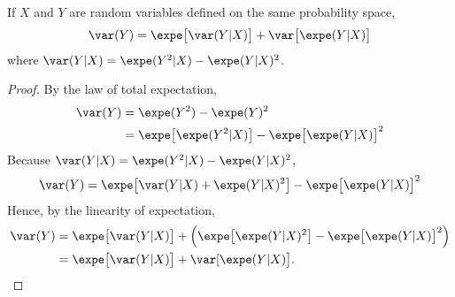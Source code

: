 \begin{theorem}
If $X$ and $Y$ are random variables defined on the same probability space,
\[
\var(Y) = \expe\big[\var(Y|X)\big] + \var\big[\expe(Y|X)\big] 
\]
where $\var(Y|X)=\expe(Y^2|X) - \expe(Y|X)^2$.
\end{theorem}
\begin{proof}
By the law of total expectation,
\begin{align*}
\var(Y)
	& = \expe(Y^2) - \expe(Y)^2 \\
	& = \expe\big[\expe(Y^2|X)\big] - \expe\big[\expe(Y|X)\big]^2
\end{align*}
Because $\var(Y|X)=\expe(Y^2|X) - \expe(Y|X)^2$,
\[
\var(Y) = \expe\big[\var(Y|X) + \expe(Y|X)^2\big] - \expe\big[\expe(Y|X)\big]^2
\]
Hence, by the linearity of expectation,
\begin{align*}
\var(Y)
	& = \expe\big[\var(Y|X)\big] + \Big(\expe\big[\expe(Y|X)^2\big] - \expe\big[\expe(Y|X)\big]^2\Big) \\
	& = \expe\big[\var(Y|X)\big] + \var[\expe(Y|X)\big].
\end{align*}
\end{proof}

